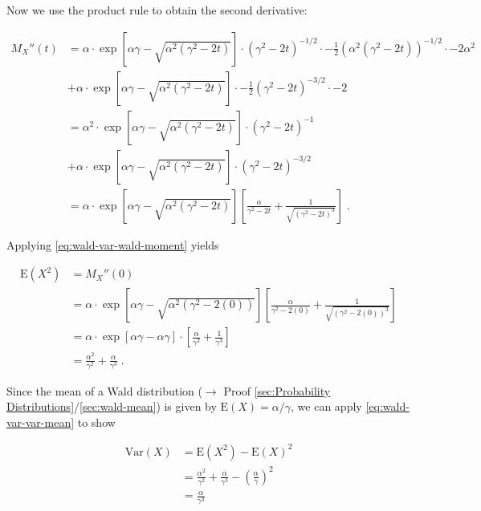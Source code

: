 \documentclass[a4paper,12pt,twoside]{book}
\begin{document}
Now we use the product rule to obtain the second derivative:

\begin{equation} \label{eq:wald-var-wald-var-s2}
\begin{split}
  M_X''(t) &= \alpha \cdot \exp\left[\alpha \gamma-\sqrt{\alpha^2(\gamma^2-2t)}\right]\cdot (\gamma^2-2t)^{-1/2}\cdot -\frac{1}{2}\left(\alpha^2(\gamma^2-2t)\right)^{-1/2}\cdot -2\alpha^2 \\
           &+ \alpha \cdot \exp\left[\alpha \gamma-\sqrt{\alpha^2(\gamma^2-2t)}\right]\cdot -\frac{1}{2}(\gamma^2-2t)^{-3/2}\cdot -2 \\
           &= \alpha^2\cdot \exp\left[\alpha \gamma-\sqrt{\alpha^2(\gamma^2-2t)}\right]\cdot (\gamma^2-2t)^{-1} \\
           &+ \alpha\cdot \exp\left[\alpha \gamma-\sqrt{\alpha^2(\gamma^2-2t)}\right]\cdot (\gamma^2-2t)^{-3/2} \\
           &= \alpha \cdot \exp\left[\alpha \gamma-\sqrt{\alpha^2(\gamma^2-2t)}\right]\left[\frac{\alpha}{\gamma^2-2t}+\frac{1}{\sqrt{(\gamma^2-2t)^3}}\right] \; .
\end{split}
\end{equation}

Applying \eqref{eq:wald-var-wald-moment} yields

\begin{equation} \label{eq:wald-var-wald-var-s3}
\begin{split}
  \mathrm{E}(X^2) &= M_X''(0) \\
                  &= \alpha \cdot \exp\left[\alpha \gamma-\sqrt{\alpha^2(\gamma^2-2(0))}\right]\left[\frac{\alpha}{\gamma^2-2(0)}+\frac{1}{\sqrt{(\gamma^2-2(0))^3}}\right] \\
                  &= \alpha \cdot \exp\left[\alpha \gamma - \alpha \gamma\right] \cdot \left[\frac{\alpha}{\gamma^2} + \frac{1}{\gamma^3}\right] \\
                  &= \frac{\alpha^2}{\gamma^2} + \frac{\alpha}{\gamma^3} \; .
\end{split}
\end{equation}

Since the mean of a Wald distribution ($\rightarrow$ Proof \ref{sec:Probability Distributions}/\ref{sec:wald-mean}) is given by $\mathrm{E}(X)=\alpha/\gamma$, we can apply \eqref{eq:wald-var-var-mean} to show

\begin{equation} \label{eq:wald-var-wald-var-s4}
\begin{split}
  \mathrm{Var}(X) &= \mathrm{E}(X^2) - \mathrm{E}(X)^2 \\
                  &= \frac{\alpha^2}{\gamma^2} + \frac{\alpha}{\gamma^3} - \left(\frac{\alpha}{\gamma}\right)^2 \\
                  &= \frac{\alpha}{\gamma^3}
\end{split}
\end{equation}
\end{document}
